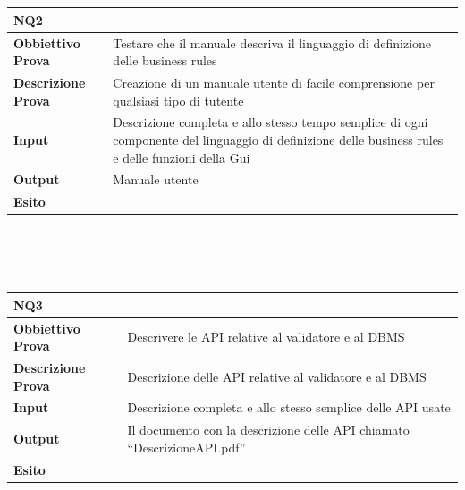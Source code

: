 \documentclass[11pt,titlepage,a4paper]{report}
\begin{document}
\\
\\
\begin{tabular}{||p{4.5cm}||p{7.5cm}||}
\hline
\textbf{\textsf{NQ2}}& \\
\hline
{\textbf {Obbiettivo Prova}}& Testare che il manuale descriva il linguaggio di definizione delle business rules \\ \hline
{\textbf{Descrizione Prova}}&  Creazione di un manuale utente di facile comprensione per qualsiasi tipo di tutente \\ \hline
{\textbf{Input}}&  Descrizione completa e allo stesso tempo semplice di ogni componente del linguaggio di definizione delle business rules e delle funzioni della Gui \\ \hline
{\textbf{Output}}& Manuale utente \\ \hline
{\textbf{Esito}}&  \\ \hline
\end{tabular} \\
\\
\\
\begin{tabular}{||p{4.5cm}||p{7.5cm}||}
\hline
\textbf{\textsf{NQ3}}& \\
\hline
{\textbf {Obbiettivo Prova}}& Descrivere le API relative al validatore e al DBMS\\ \hline
{\textbf{Descrizione Prova}}&  Descrizione delle API relative al validatore e al DBMS\\ \hline
{\textbf{Input}}&  Descrizione completa e allo stesso semplice delle API usate \\ \hline
{\textbf{Output}}& Il documento con la descrizione delle API chiamato ``DescrizioneAPI.pdf''  \\ \hline
{\textbf{Esito}}&  \\ \hline
\end{tabular} \\
\end{document}

